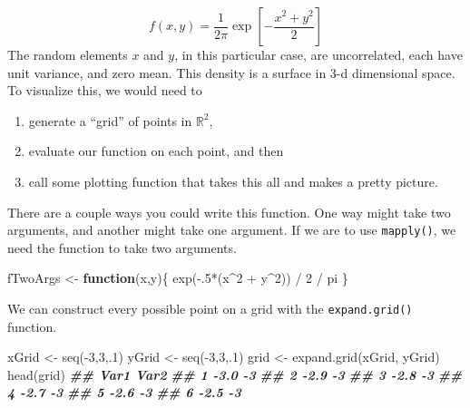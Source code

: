 \documentclass[
  12pt,
]{krantz}
\makeatletter
\newenvironment{Shaded}{\begin{snugshade}}{\end{snugshade}}
\newcommand{\ControlFlowTok}[1]{\textcolor[rgb]{0.27,0.27,0.27}{\textbf{#1}}}
\newcommand{\DecValTok}[1]{\textcolor[rgb]{0.06,0.06,0.06}{#1}}
\newcommand{\DocumentationTok}[1]{\textcolor[rgb]{0.37,0.37,0.37}{\textbf{\textit{#1}}}}
\newcommand{\FunctionTok}[1]{\textcolor[rgb]{0,0,0}{#1}}
\newcommand{\NormalTok}[1]{#1}
\newcommand{\OtherTok}[1]{\textcolor[rgb]{0.37,0.37,0.37}{#1}}
\newcommand{\SpecialCharTok}[1]{\textcolor[rgb]{0,0,0}{#1}}
\providecommand{\tightlist}{%
  \setlength{\itemsep}{0pt}\setlength{\parskip}{0pt}}
\newenvironment{kframe}{%
\medskip{}
\setlength{\fboxsep}{.8em}
 \def\at@end@of@kframe{}%
 \ifinner\ifhmode%
  \def\at@end@of@kframe{\end{minipage}}%
  \begin{minipage}{\columnwidth}%
 \fi\fi%
 \def\FrameCommand##1{\hskip\@totalleftmargin \hskip-\fboxsep
 \colorbox{shadecolor}{##1}\hskip-\fboxsep
     \hskip-\linewidth \hskip-\@totalleftmargin \hskip\columnwidth}%
 \MakeFramed {\advance\hsize-\width
   \@totalleftmargin\z@ \linewidth\hsize
   \@setminipage}}%
 {\par\unskip\endMakeFramed%
 \at@end@of@kframe}
\renewenvironment{Shaded}{\begin{kframe}}{\end{kframe}}
\makeatother
\begin{document}
\[
f(x,y) = \frac{1}{2 \pi}  \exp\left[ -\frac{x ^2 + y^2}{2}     \right]
\]
The random elements \(x\) and \(y\), in this particular case, are uncorrelated, each have unit variance, and zero mean. This density is a surface in 3-d dimensional space. To visualize this, we would need to

\begin{enumerate}
\def\labelenumi{\arabic{enumi}.}
\tightlist
\item
  generate a ``grid'' of points in \(\mathbb{R}^2\),
\item
  evaluate our function on each point, and then
\item
  call some plotting function that takes this all and makes a pretty picture.
\end{enumerate}

There are a couple ways you could write this function. One way might take two arguments, and another might take one argument. If we are to use \texttt{mapply()}, we need the function to take two arguments.

\begin{Shaded}
\begin{Highlighting}[]
\NormalTok{fTwoArgs }\OtherTok{\textless{}{-}} \ControlFlowTok{function}\NormalTok{(x,y)\{}
  \FunctionTok{exp}\NormalTok{(}\SpecialCharTok{{-}}\NormalTok{.}\DecValTok{5}\SpecialCharTok{*}\NormalTok{(x}\SpecialCharTok{\^{}}\DecValTok{2} \SpecialCharTok{+}\NormalTok{ y}\SpecialCharTok{\^{}}\DecValTok{2}\NormalTok{)) }\SpecialCharTok{/} \DecValTok{2} \SpecialCharTok{/}\NormalTok{ pi}
\NormalTok{\}}
\end{Highlighting}
\end{Shaded}

We can construct every possible point on a grid with the \texttt{expand.grid()} function.

\begin{Shaded}
\begin{Highlighting}[]
\NormalTok{xGrid }\OtherTok{\textless{}{-}} \FunctionTok{seq}\NormalTok{(}\SpecialCharTok{{-}}\DecValTok{3}\NormalTok{,}\DecValTok{3}\NormalTok{,.}\DecValTok{1}\NormalTok{)}
\NormalTok{yGrid }\OtherTok{\textless{}{-}} \FunctionTok{seq}\NormalTok{(}\SpecialCharTok{{-}}\DecValTok{3}\NormalTok{,}\DecValTok{3}\NormalTok{,.}\DecValTok{1}\NormalTok{)}
\NormalTok{grid }\OtherTok{\textless{}{-}} \FunctionTok{expand.grid}\NormalTok{(xGrid, yGrid)}
\FunctionTok{head}\NormalTok{(grid)}
\DocumentationTok{\#\#   Var1 Var2}
\DocumentationTok{\#\# 1 {-}3.0   {-}3}
\DocumentationTok{\#\# 2 {-}2.9   {-}3}
\DocumentationTok{\#\# 3 {-}2.8   {-}3}
\DocumentationTok{\#\# 4 {-}2.7   {-}3}
\DocumentationTok{\#\# 5 {-}2.6   {-}3}
\DocumentationTok{\#\# 6 {-}2.5   {-}3}
\end{Highlighting}
\end{Shaded}
\end{document}
